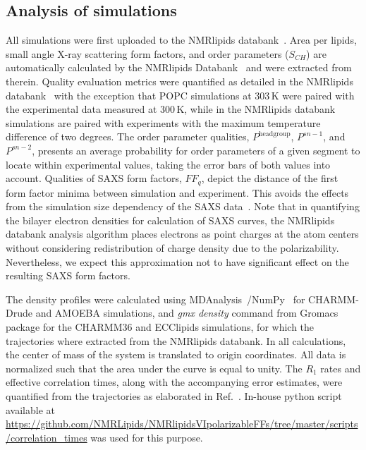 \documentclass[journal=jctcce,manuscript=article,layout=singlecolumn]{achemso}
\begin{document}
\subsection{Analysis of simulations}
All simulations were first uploaded to the NMRlipids databank~\cite{Databank}. Area per lipids, small angle X-ray scattering form factors, and order parameters ($S_{CH}$) are automatically calculated by the NMRlipids Databank~\cite{Databank} and were extracted from therein. Quality evaluation metrics were quantified as detailed in the NMRlipids databank~\cite{Databank} with the exception that POPC simulations at 303\,K were paired with the experimental data measured at 300\,K, while in the NMRlipids databank simulations are paired with experiments with the maximum temperature difference of two degrees. The order parameter qualities, $P^{\mathrm{headgroup}}$, $P^{sn-1}$, and $P^{sn-2}$, presents an average probability for order parameters of a given segment to locate within experimental values, taking the error bars of both values into account. Qualities of SAXS form factors, $FF_{q}$, depict the distance of the first form factor minima between simulation and experiment. This avoids the effects from the simulation size dependency of the SAXS data~\cite{Databank}.
Note that in quantifying the bilayer electron densities for calculation of SAXS curves, the NMRlipids databank analysis algorithm places electrons as point charges at the atom centers without considering redistribution of charge density due to the polarizability. Nevertheless, we expect this approximation not to have significant effect on the resulting SAXS form factors.

The density profiles were calculated using  MDAnalysis~\cite{michaud2011mdanalysis,gowers2016mdanalysis}/NumPy~\cite{harris2020array} for CHARMM-Drude and AMOEBA simulations, and 
\textit{gmx density} command from Gromacs package for the CHARMM36 and ECClipids simulations, for which the trajectories where extracted from the NMRlipids databank. In all calculations, the center of mass of the system is translated to origin coordinates. All data is normalized such that the area under the curve is equal to unity. The $R_{1}$ rates and effective correlation times, along with the accompanying error estimates, were quantified from the trajectories as elaborated in Ref.~. In-house python script available at \url{https://github.com/NMRLipids/NMRlipidsVIpolarizableFFs/tree/master/scripts/correlation_times} was used for this purpose. 
\end{document}
